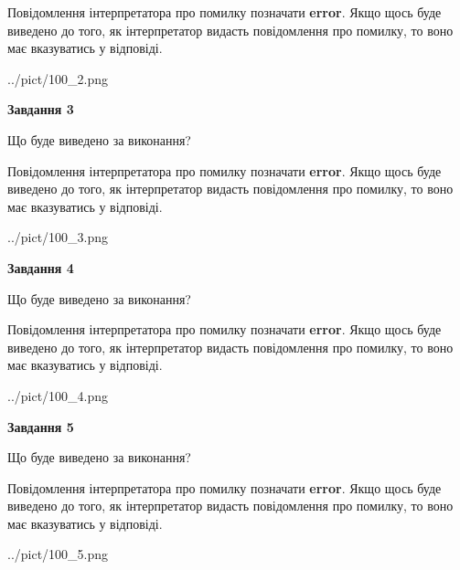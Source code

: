 \documentclass[12pt, ukrainian]{article}
\begin{document}
{\begin {large}
Повідомлення інтерпретатора про помилку позначати \textbf{error}.
Якщо щось буде виведено до того, як інтерпретатор видасть повідомлення про помилку, 
то воно має вказуватись у відповіді. \par


\begin{center}
	{../pict/100_2.png}
\end{center}
\newpage

{\begin {center}\textbf{Завдання 3}\end {center}}\par
Що буде виведено за виконання?

Повідомлення інтерпретатора про помилку позначати \textbf{error}.
Якщо щось буде виведено до того, як інтерпретатор видасть повідомлення про помилку, 
то воно має вказуватись у відповіді. \par


\begin{center}
	{../pict/100_3.png}
\end{center}
\newpage

{\begin {center}\textbf{Завдання 4}\end {center}}\par
Що буде виведено за виконання?

Повідомлення інтерпретатора про помилку позначати \textbf{error}.
Якщо щось буде виведено до того, як інтерпретатор видасть повідомлення про помилку, 
то воно має вказуватись у відповіді. \par


\begin{center}
	{../pict/100_4.png}
\end{center}
\newpage

{\begin {center}\textbf{Завдання 5}\end {center}}\par
Що буде виведено за виконання?

Повідомлення інтерпретатора про помилку позначати \textbf{error}.
Якщо щось буде виведено до того, як інтерпретатор видасть повідомлення про помилку, 
то воно має вказуватись у відповіді. \par


\begin{center}
	{../pict/100_5.png}
\end{center}
\newpage


\end{large}}
\end{document}

